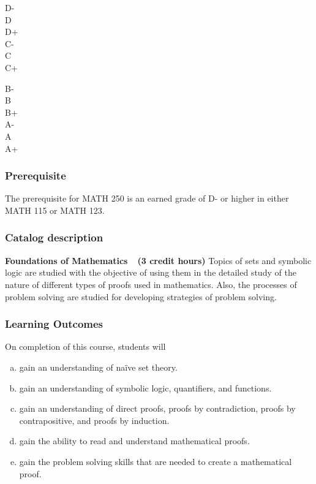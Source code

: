 \documentclass[12pt]{article}
\newcounter{ex}\setcounter{ex}{0}
\newenvironment{mypar}[2]
  {\begin{list}{}%
    {\setlength\leftmargin{#1}
    \setlength\rightmargin{#2}}
    \item[]}
  {\end{list}}
\newenvironment{alphalist}{
  \begin{enumerate}[(a)]
    \addtolength{\itemsep}{-0.75\itemsep}}
  {\end{enumerate}}
\begin{document}
 \vspace{0.1in}
     \begin{minipage}{5.5in}
  \centering 
\begin{mypar}{0.25in}{0.25in}
    \begin{minipage}{2.5in}
        D-  \dotfill \Dm \\
        D \dotfill \D \\
        D+ \dotfill \Dp \\
        C- \dotfill \Cm  \\
        C \dotfill \C \\
        C+ \dotfill \Cp 
        \end{minipage}
    \phantom{xxx}
    \begin{minipage}{2.5in}
        B- \dotfill \Bm \\
        B \dotfill  \B \\
        B+ \dotfill  \Bp\\
        A- \dotfill  \Am \\
        A \dotfill  \A \\
        A+ \dotfill  \Ap
    \end{minipage}
\end{mypar} 
\end{minipage}

\subsubsection*{Prerequisite}

The prerequisite for MATH 250 is an earned grade of D- or higher in either MATH 115 or MATH 123.

\subsubsection*{Catalog description}

\textbf{Foundations of Mathematics  (3 credit hours)} Topics of sets and symbolic logic are studied with the objective of using them in the detailed study of the nature of different types of proofs used in mathematics. Also, the processes of problem solving are studied for developing strategies of problem solving.

\subsubsection*{Learning Outcomes}

On completion of this course, students will
\begin{alphalist}
    \item gain an understanding of na\"ive set theory. 
    \item gain an understanding of symbolic logic, quantifiers, and functions.
    \item gain an understanding of direct proofs, proofs by contradiction, proofs by contrapositive, and proofs by induction.
    \item gain the ability to read and understand mathematical proofs.
    \item gain the problem solving skills that are needed to create a mathematical proof.
\end{alphalist}
\end{document}
